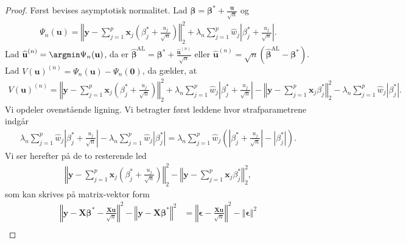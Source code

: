 \begin{proof}
Først bevises asymptotisk normalitet. Lad $\boldsymbol{\beta}=\boldsymbol{\beta}^{*} +\frac{\textbf{u}}{\sqrt{n}}$ og
\begin{align*}
\Psi_n(\textbf{u})=\left\Vert \mathbf{y}-\sum_{j=1}^p \textbf{x}_j \left( \beta_j^{*} +\frac{u_j}{\sqrt{n}} \right) \right\Vert_2^2 + \lambda_n \sum_{j=1}^p \widehat{w}_j \left\vert \beta_j^{*} + \frac{u_j}{\sqrt{n}} \right\vert.
\end{align*}
Lad $\widehat{\textbf{u}}^{(n)}=\argmin \Psi_n(\textbf{u})$, da er $\widehat{\boldsymbol{\beta}}^{{\text{AL}}}=\boldsymbol{\beta}^{*} + \frac{\widehat{\boldsymbol{u}}^{(n)}}{\sqrt{n}}$ eller $\widehat{\boldsymbol{u}}^{(n)}=\sqrt{n}\left(\widehat{\boldsymbol{\beta}}^{\text{AL}}-\boldsymbol{\beta}^{*}\right)$.
Lad $V(\mathbf{u})^{(n)}=\Psi_n(\textbf{u}) - \Psi_n(\textbf{0})$, da gælder, at
\begin{align*}
V(\mathbf{u})^{(n)}= \left\Vert \textbf{y} - \sum_{j=1}^p \textbf{x}_j \left( \beta_j^{*} + \frac{u_j}{\sqrt{n}} \right) \right\Vert_2^2 +
\lambda_n \sum_{j=1}^p \widehat{w}_j \left\vert \beta_j^{*} + \frac{u_j}{\sqrt{n}} \right\vert 
-
\left\Vert \textbf{y} - \sum_{j=1}^p \textbf{x}_j \beta_j^{*} \right\Vert_2^2 - \lambda_n \sum_{j=1}^p \widehat{w}_j \left\vert \beta_j^{*} \right\vert.
\end{align*}
Vi opdeler ovenstående ligning.
Vi betragter først leddene hvor strafparametrene indgår
\begin{align*}
\lambda_n \sum_{j=1}^p \widehat{w}_j \left\vert \beta_j^{*} + \frac{u_j}{\sqrt{n}} \right\vert- \lambda_n \sum_{j=1}^p \widehat{w}_j \left\vert \beta_j^{*} \right\vert 
= \lambda_n \sum_{j=1}^p \widehat{w}_j \left( \left\vert \beta_j^{*} + \frac{u_j}{\sqrt{n}} \right\vert - \left\vert \beta_j^{*} \right\vert
\right).
\end{align*}
Vi ser herefter på de to resterende led
\begin{align*}
\left\Vert \textbf{y} - \sum_{j=1}^p \textbf{x}_j \left( \beta_j^{*} + \frac{u_j}{\sqrt{n}} \right) \right\Vert_2^2 -\left\Vert \textbf{y} - \sum_{j=1}^p \textbf{x}_j \beta_j^{*} \right\Vert_2^2,
\end{align*}
som kan skrives på matrix-vektor form
\begin{align*}
\left\Vert \textbf{y}-\textbf{X}\boldsymbol{\beta}^{*} -\frac{\textbf{X}\textbf{u}}{\sqrt{n}} \right\Vert^2 - \left\Vert \textbf{y} - \textbf{X} \boldsymbol{\beta}^{*} \right\Vert^2  & =
\left\Vert \boldsymbol{\epsilon} - \frac{\textbf{X}\textbf{u}}{\sqrt{n}} \right\Vert^2 - \left\Vert \boldsymbol{\epsilon} \right\Vert^2  \\

\end{align*}
\end{proof}
